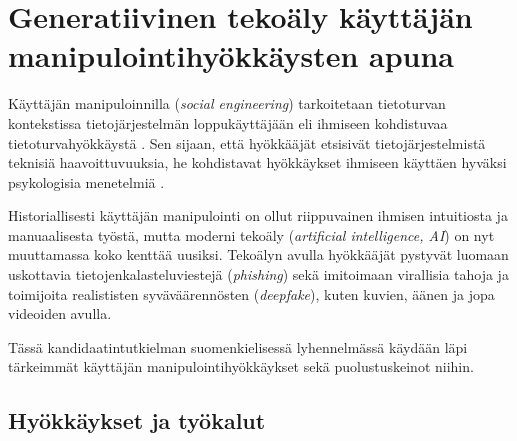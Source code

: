 

\chapter*{Generatiivinen tekoäly käyttäjän manipulointihyökkäysten apuna\label{chapter:finnish}}
\begin{comment}

Tekoälyä hyödyntävä käyttäjän manipulointi
Teokälypohjainen käyttäjän manipulointi
Tekoälyavusteinen käyttäjän manipulointi

Pyydä Riinalta ym palautetta kieliopin tarkistuksessa! Opin samalla itse. Riinahan voi tarkistaa esim tätä .tex tiedostoa GitHubista? Tai PDF kumpi vaan hänelle parempi, mutta PDF:n kassa pitää muistaa aina päivittää se Overleafiin ja sitten GitHubiin.

Ohjeet:
    - 4 or 5 sivua
    - TOC ja Chapter 1 Introduction väliin

Kappaleet:
    - (ilman nimeä sisältää Introduction ja Definition kappaleet)
    - Hyökkäykset ja työkalut
    - Puolustuskeinot
    - Puolustuskeinojen arviointia
    - Yhteenveto
    - EI Overleaf kappalenumerointia? Kappale "0"?
    

\end{comment}


Käyttäjän manipuloinnilla (\textit{social engineering}) tarkoitetaan tietoturvan kontekstissa tietojärjestelmän loppukäyttäjään eli ihmiseen kohdistuvaa tietoturvahyökkäystä \citep{mitnick_The_Art_of_Deception_2003}. Sen sijaan, että hyökkääjät etsisivät tietojärjestelmistä teknisiä haavoittuvuuksia, he kohdistavat hyökkäykset ihmiseen käyttäen hyväksi psykologisia menetelmiä \citep{wang_Defining_Social_Engineering_2020}.

Historiallisesti käyttäjän manipulointi on ollut riippuvainen ihmisen intuitiosta ja manuaalisesta työstä, mutta moderni tekoäly (\textit{artificial intelligence, AI}) on nyt muuttamassa koko kenttää uusiksi. Tekoälyn avulla hyökkääjät pystyvät luomaan uskottavia tietojenkalasteluviestejä (\textit{phishing}) sekä imitoimaan virallisia tahoja ja toimijoita realististen syväväärennösten (\textit{deepfake}), kuten kuvien, äänen ja jopa videoiden avulla.

Tässä kandidaatintutkielman suomenkielisessä lyhennelmässä käydään läpi tärkeimmät käyttäjän manipulointihyökkäykset sekä puolustuskeinot niihin.

\section*{Hyökkäykset ja työkalut}

